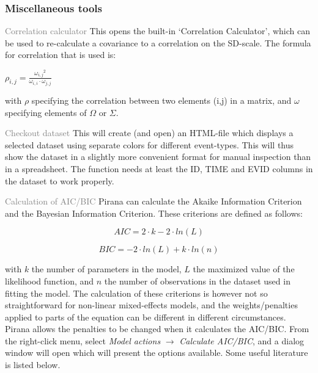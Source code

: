 {{{{\subsubsection*{Miscellaneous tools}

\begin {description}
  \item{\textcolor{Grey}{Correlation calculator}} This opens the
built-in `Correlation Calculator', which can be used to re-calculate a
covariance to a correlation on the SD-scale. The formula for
correlation that is used is:

\vspace{10pt}
$ \rho_{i,j} = \frac{{\omega_{i,j}}^2 }{\omega_{i,i} \cdot \omega_{j,j} }
$
\vspace{10pt}

with $\rho$ specifying the correlation between two elements (i,j) in a
matrix, and $\omega$ specifying elements of $\Omega$ or $\Sigma$.

  \item{\textcolor{Grey}{Checkout dataset}} This will create (and open)
an HTML-file which displays a selected dataset using separate colors for
different event-types. This will thus show the dataset in a slightly more
convenient format for manual inspection than in a spreadsheet. The
function needs at least the ID, TIME and EVID columns in the dataset to work properly.

  \item{\textcolor{Grey}{Calculation of AIC/BIC}} Pirana can calculate
    the Akaike Information Criterion and the Bayesian Information
    Criterion. These criterions are defined as follows:

\begin{equation}
AIC = 2 \cdot k - 2 \cdot ln(L)
\end{equation}

\begin{equation}
BIC = -2 \cdot ln(L) + k \cdot ln(n)
\end{equation}

with $k$ the number of parameters in the model, $L$ the maximized
value of the likelihood function, and $n$ the number of observations
in the dataset used in fitting the model. The calculation of these
criterions is however not so straightforward for non-linear mixed-effects
models, and the weights/penalties applied to parts of the equation can
be different in different circumstances. Pirana allows the penalties
to be changed when it calculates the AIC/BIC. From the right-click
menu, select \textit{Model actions} $\rightarrow$ \textit{Calculate
  AIC/BIC}, and a dialog window will open which will present the
options available. Some useful literature is listed below.


\end{description}}}}}
